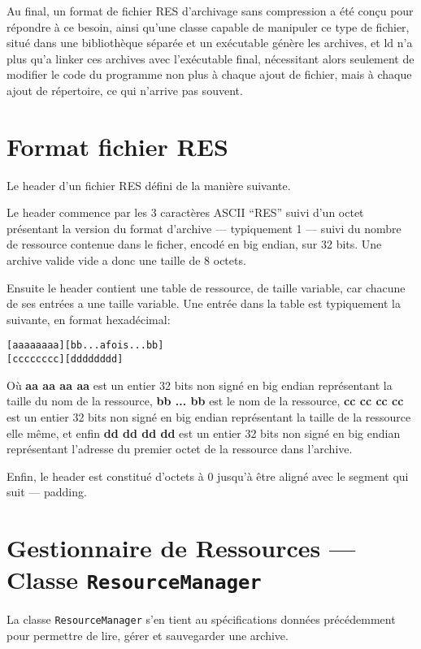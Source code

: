 \documentclass[pdftex, 11pt, a4paper, titlepage]{article}
\begin{document}
Au final, un format de fichier RES d'archivage sans compression a été
conçu pour répondre à ce besoin, ainsi qu'une classe capable de
manipuler ce type de fichier, situé dans une bibliothèque séparée et
un exécutable génère les archives, et ld n'a plus qu'a linker ces
archives avec l'exécutable final, nécessitant alors seulement de
modifier le code du programme non plus à chaque ajout de fichier, mais
à chaque ajout de répertoire, ce qui n'arrive pas souvent.

\pagebreak

\section{Format fichier RES}

Le header d'un fichier RES défini de la manière suivante.

Le header commence par les 3 caractères ASCII ``RES'' suivi d'un octet
présentant la version du format d'archive --- typiquement 1 --- suivi
du nombre de ressource contenue dans le ficher, encodé en big endian,
sur 32 bits.  Une archive valide vide a donc une taille de 8 octets.

Ensuite le header contient une table de ressource, de taille variable,
car chacune de ses entrées a une taille variable.  Une entrée dans la
table est typiquement la suivante, en format hexadécimal:

\begin{alltt}
[ aa aa aa aa ] [ bb {... a fois ...} bb]
[ cc cc cc cc] [ dd dd dd dd ]
\end{alltt}

Où \textbf{aa aa aa aa} est un entier 32 bits non signé en big endian
représentant la taille du nom de la ressource, \textbf{bb ... bb} est
le nom de la ressource, \textbf{cc cc cc cc} est un entier 32 bits non
signé en big endian représentant la taille de la ressource elle même,
et enfin \textbf{dd dd dd dd} est un entier 32 bits non signé en big
endian représentant l'adresse du premier octet de la ressource dans
l'archive.

Enfin, le header est constitué d'octets à 0 jusqu'à être aligné avec
le segment qui suit --- padding.

\section{Gestionnaire de Ressources --- Classe
  \texttt{ResourceManager}}

La classe \texttt{ResourceManager} s'en tient au spécifications
données précédemment pour permettre de lire, gérer et sauvegarder une
archive.
\end{document}

